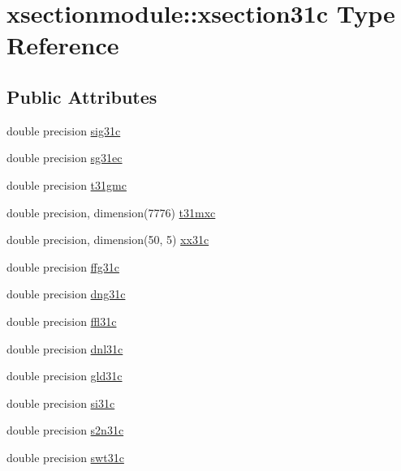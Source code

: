 \hypertarget{structxsectionmodule_1_1xsection31c}{}\section{xsectionmodule\+:\+:xsection31c Type Reference}
\label{structxsectionmodule_1_1xsection31c}
\subsection*{Public Attributes}
\begin{DoxyCompactItemize}
\item 
double precision \hyperlink{structxsectionmodule_1_1xsection31c_aadf9e6d6ff5fb43f5aeb86188effa70d}{sig31c}
\item 
double precision \hyperlink{structxsectionmodule_1_1xsection31c_a43b05387fe910fc0aefc675b85bdb4ff}{sg31ec}
\item 
double precision \hyperlink{structxsectionmodule_1_1xsection31c_a674739b4d799fe7ab101338bc6c4f9ce}{t31gmc}
\item 
double precision, dimension(7776) \hyperlink{structxsectionmodule_1_1xsection31c_ac5c439d024e894f578deeba78b953ef8}{t31mxc}
\item 
double precision, dimension(50, 5) \hyperlink{structxsectionmodule_1_1xsection31c_a7b8bd4f8ed9ea79eb0877b328bac90e4}{xx31c}
\item 
double precision \hyperlink{structxsectionmodule_1_1xsection31c_a76ccf69b3cd3ed5b1d2f2cd35c96f1c7}{ffg31c}
\item 
double precision \hyperlink{structxsectionmodule_1_1xsection31c_a0257fa78071d428ca6ad6df960294783}{dng31c}
\item 
double precision \hyperlink{structxsectionmodule_1_1xsection31c_a5d9628643d97c31e2dd271fe47c61367}{ffl31c}
\item 
double precision \hyperlink{structxsectionmodule_1_1xsection31c_a4084598afc31fc86a69608e80ce4f000}{dnl31c}
\item 
double precision \hyperlink{structxsectionmodule_1_1xsection31c_a851b5a70a1dc77ade4682eef6b384d53}{gld31c}
\item 
double precision \hyperlink{structxsectionmodule_1_1xsection31c_a147aa49cd6b58271875996b4384df22f}{si31c}
\item 
double precision \hyperlink{structxsectionmodule_1_1xsection31c_ab0fdf74d3315d89fbf65266effb07458}{s2n31c}
\item 
double precision \hyperlink{structxsectionmodule_1_1xsection31c_a33c3672e5ec168ac75090424467308c0}{swt31c}

\end{DoxyCompactItemize}
